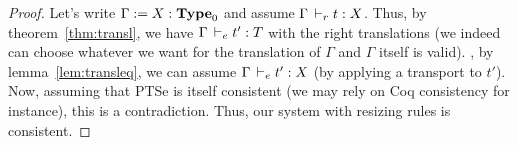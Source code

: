 \documentclass[a4paper,english]{lipics-utf8x}
\begin{document}
  \begin{proof}
    Let's write $\Gamma := X : \operatorname{\mathbf{Type}}_0$ and assume $\Gamma \,\vdash_r t : X$.
    Thus, by theorem~\ref{thm:transl}, we have $\Gamma \,\vdash_e t' : T$ with
    the right translations (we indeed can choose whatever we want for the
    translation of $\Gamma$ and $\Gamma$ itself is valid).
    \Wlog, by lemma~\ref{lem:transleq}, we can assume
    $\Gamma \,\vdash_e t' : X$ (by applying a transport to $t'$).
    Now, assuming that PTSe is itself consistent (we may rely on Coq consistency
    for instance), this is a contradiction.
    Thus, our system with resizing rules is consistent.
  \end{proof}
\end{document}

